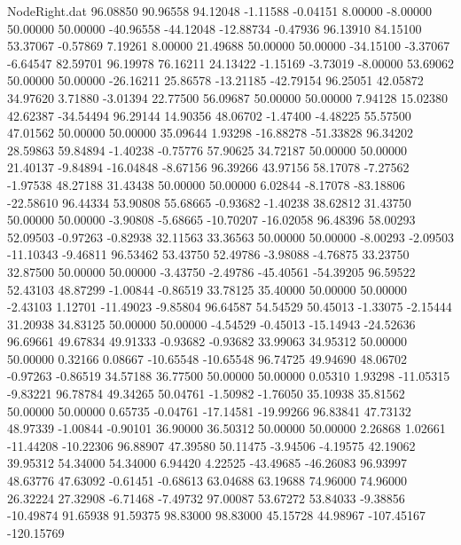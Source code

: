\begin{filecontents}{NodeRight.dat}
  96.08850   90.96558   94.12048    -1.11588   -0.04151    8.00000   -8.00000   50.00000   50.00000  -40.96558  -44.12048  -12.88734   -0.47936
  96.13910   84.15100   53.37067    -0.57869    7.19261    8.00000   21.49688   50.00000   50.00000  -34.15100   -3.37067   -6.64547   82.59701
  96.19978   76.16211   24.13422    -1.15169   -3.73019   -8.00000   53.69062   50.00000   50.00000  -26.16211   25.86578  -13.21185  -42.79154
  96.25051   42.05872   34.97620     3.71880   -3.01394   22.77500   56.09687   50.00000   50.00000    7.94128   15.02380   42.62387  -34.54494
  96.29144   14.90356   48.06702    -1.47400   -4.48225   55.57500   47.01562   50.00000   50.00000   35.09644    1.93298  -16.88278  -51.33828
  96.34202   28.59863   59.84894    -1.40238   -0.75776   57.90625   34.72187   50.00000   50.00000   21.40137   -9.84894  -16.04848   -8.67156
  96.39266   43.97156   58.17078    -7.27562   -1.97538   48.27188   31.43438   50.00000   50.00000    6.02844   -8.17078  -83.18806  -22.58610
  96.44334   53.90808   55.68665    -0.93682   -1.40238   38.62812   31.43750   50.00000   50.00000   -3.90808   -5.68665  -10.70207  -16.02058
  96.48396   58.00293   52.09503    -0.97263   -0.82938   32.11563   33.36563   50.00000   50.00000   -8.00293   -2.09503  -11.10343   -9.46811
  96.53462   53.43750   52.49786    -3.98088   -4.76875   33.23750   32.87500   50.00000   50.00000   -3.43750   -2.49786  -45.40561  -54.39205
  96.59522   52.43103   48.87299    -1.00844   -0.86519   33.78125   35.40000   50.00000   50.00000   -2.43103    1.12701  -11.49023   -9.85804
  96.64587   54.54529   50.45013    -1.33075   -2.15444   31.20938   34.83125   50.00000   50.00000   -4.54529   -0.45013  -15.14943  -24.52636
  96.69661   49.67834   49.91333    -0.93682   -0.93682   33.99063   34.95312   50.00000   50.00000    0.32166    0.08667  -10.65548  -10.65548
  96.74725   49.94690   48.06702    -0.97263   -0.86519   34.57188   36.77500   50.00000   50.00000    0.05310    1.93298  -11.05315   -9.83221
  96.78784   49.34265   50.04761    -1.50982   -1.76050   35.10938   35.81562   50.00000   50.00000    0.65735   -0.04761  -17.14581  -19.99266
  96.83841   47.73132   48.97339    -1.00844   -0.90101   36.90000   36.50312   50.00000   50.00000    2.26868    1.02661  -11.44208  -10.22306
  96.88907   47.39580   50.11475    -3.94506   -4.19575   42.19062   39.95312   54.34000   54.34000    6.94420    4.22525  -43.49685  -46.26083
  96.93997   48.63776   47.63092    -0.61451   -0.68613   63.04688   63.19688   74.96000   74.96000   26.32224   27.32908   -6.71468   -7.49732
  97.00087   53.67272   53.84033    -9.38856  -10.49874   91.65938   91.59375   98.83000   98.83000   45.15728   44.98967 -107.45167 -120.15769

\end{filecontents}
